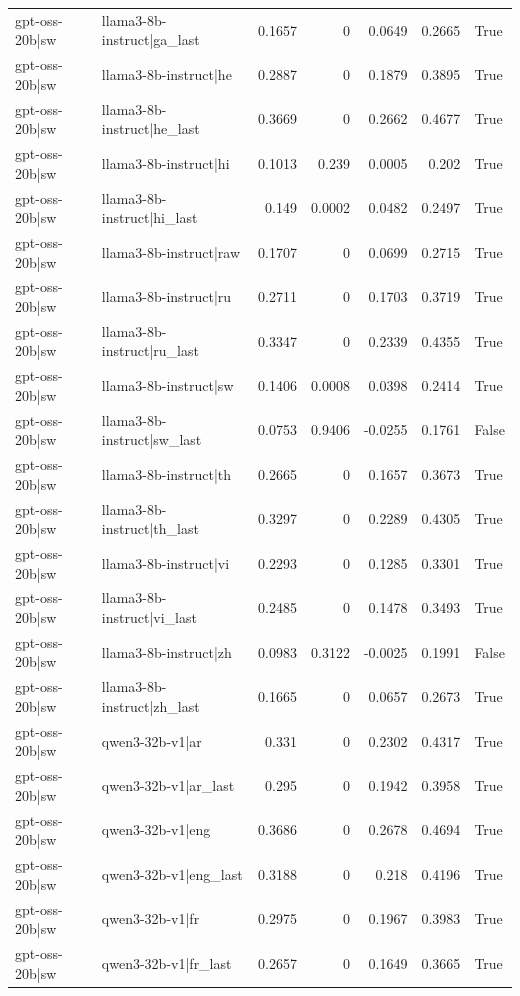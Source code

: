 \begin{table}
\begin{tabular}{l l r r r r l}
gpt-oss-20b|sw & llama3-8b-instruct|ga_last & 0.1657 & 0 & 0.0649 & 0.2665 & True \\
gpt-oss-20b|sw & llama3-8b-instruct|he & 0.2887 & 0 & 0.1879 & 0.3895 & True \\
gpt-oss-20b|sw & llama3-8b-instruct|he_last & 0.3669 & 0 & 0.2662 & 0.4677 & True \\
gpt-oss-20b|sw & llama3-8b-instruct|hi & 0.1013 & 0.239 & 0.0005 & 0.202 & True \\
gpt-oss-20b|sw & llama3-8b-instruct|hi_last & 0.149 & 0.0002 & 0.0482 & 0.2497 & True \\
gpt-oss-20b|sw & llama3-8b-instruct|raw & 0.1707 & 0 & 0.0699 & 0.2715 & True \\
gpt-oss-20b|sw & llama3-8b-instruct|ru & 0.2711 & 0 & 0.1703 & 0.3719 & True \\
gpt-oss-20b|sw & llama3-8b-instruct|ru_last & 0.3347 & 0 & 0.2339 & 0.4355 & True \\
gpt-oss-20b|sw & llama3-8b-instruct|sw & 0.1406 & 0.0008 & 0.0398 & 0.2414 & True \\
gpt-oss-20b|sw & llama3-8b-instruct|sw_last & 0.0753 & 0.9406 & -0.0255 & 0.1761 & False \\
gpt-oss-20b|sw & llama3-8b-instruct|th & 0.2665 & 0 & 0.1657 & 0.3673 & True \\
gpt-oss-20b|sw & llama3-8b-instruct|th_last & 0.3297 & 0 & 0.2289 & 0.4305 & True \\
gpt-oss-20b|sw & llama3-8b-instruct|vi & 0.2293 & 0 & 0.1285 & 0.3301 & True \\
gpt-oss-20b|sw & llama3-8b-instruct|vi_last & 0.2485 & 0 & 0.1478 & 0.3493 & True \\
gpt-oss-20b|sw & llama3-8b-instruct|zh & 0.0983 & 0.3122 & -0.0025 & 0.1991 & False \\
gpt-oss-20b|sw & llama3-8b-instruct|zh_last & 0.1665 & 0 & 0.0657 & 0.2673 & True \\
gpt-oss-20b|sw & qwen3-32b-v1|ar & 0.331 & 0 & 0.2302 & 0.4317 & True \\
gpt-oss-20b|sw & qwen3-32b-v1|ar_last & 0.295 & 0 & 0.1942 & 0.3958 & True \\
gpt-oss-20b|sw & qwen3-32b-v1|eng & 0.3686 & 0 & 0.2678 & 0.4694 & True \\
gpt-oss-20b|sw & qwen3-32b-v1|eng_last & 0.3188 & 0 & 0.218 & 0.4196 & True \\
gpt-oss-20b|sw & qwen3-32b-v1|fr & 0.2975 & 0 & 0.1967 & 0.3983 & True \\
gpt-oss-20b|sw & qwen3-32b-v1|fr_last & 0.2657 & 0 & 0.1649 & 0.3665 & True \\

\end{tabular}
\end{table}
